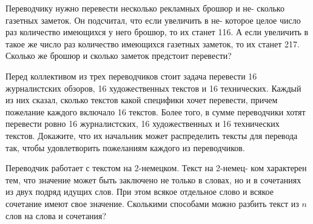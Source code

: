 ﻿
\begin{itemize}

\itA Переводчику нужно перевести несколько рекламных брошюр и не- сколько газетных заметок. Он подсчитал, что если увеличить в не- которое целое число раз количество имеющихся у него брошюр, то их станет 116. А если увеличить в такое же число раз количество имеющихся газетных заметок, то их станет 217. Сколько же брошюр и сколько заметок предстоит перевести?

\itB Перед коллективом из трех переводчиков стоит задача перевести 16 журналистских обзоров, 16 художественных текстов и 16 технических. Каждый из них сказал, сколько текстов какой специфики хочет перевести, причем пожелание каждого включало 16 текстов. Более того, в сумме переводчики хотят перевести ровно 16 журналистских, 16 художественных и 16 технических текстов. Докажите, что их начальник может распределить тексты для перевода так, чтобы удовлетворить пожеланиям каждого из переводчиков.

\itC Переводчик работает с текстом на 2-немецком. Текст на 2-немец- ком характерен тем, что значение может быть заключено не только в словах, но и в сочетаниях из двух подряд идущих слов. При этом всякое отдельное слово и всякое сочетание имеют свое значение. Сколькими способами можно разбить текст из $n$ слов на слова и сочетания?
\end{itemize}